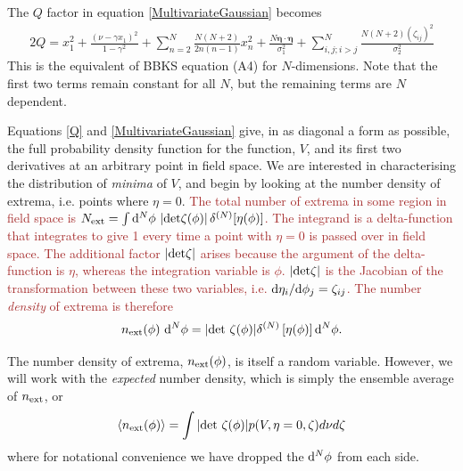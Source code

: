 \documentclass[12pt]{article}
\newcommand{\sh}[1]{\textcolor{brown}{#1}}
\begin{document}
The $Q$ factor in equation \eqref{MultivariateGaussian} becomes
%
\begin{equation} \label{Q}
\begin{split}
2Q = x_1^2 + \frac{(\nu-\gamma x_1)^2}{1-\gamma^2}+\sum_{n=2}^N\frac{N(N+2)}{2n(n-1)}x_n^2 + \frac{N \pmb{\eta}\cdot \pmb{\eta}}{\sigma_1^2} + \sum_{i,j;i > j}^N\frac{N(N+2)(\zeta_{ij})^2}{\sigma_2^2}
\end{split}
\end{equation}
%
This is the equivalent of BBKS equation (A4) for $N$-dimensions. Note that the first two terms remain constant for all $N$, but the remaining terms are $N$ dependent.  

Equations \eqref{Q} and \eqref{MultivariateGaussian} give, in as diagonal a form as possible, the full probability density function for the function, $V$, and its first two derivatives at an arbitrary point in field space. We are interested in characterising the distribution of \emph{minima} of $V$, and begin by looking at the number density of extrema, i.e. points where $\eta=0$. \sh{The total number of extrema in some region in field space is $N_{\rm ext} = \int {\rm d}^N\phi \, \left| {\rm det}\zeta(\phi)\right|\delta^{(N)}[\eta(\phi)]$. The integrand is a delta-function that integrates to give 1 every time a point with $\eta=0$ is passed over in field space. The additional factor $\left| {\rm det \zeta} \right|$ arises because the argument of the delta-function is $\eta$, whereas the integration variable is $\phi$. $|{\rm det}\zeta|$ is the Jacobian of the transformation between these two variables, i.e. ${\rm d}\eta_i/{\rm d}\phi_j = \zeta_{ij}$. The number \emph{density} of extrema is therefore}
%
\begin{equation}
n_{\rm ext}(\phi) \,\,{\rm d}^N \phi= |{\rm det}\,\, \zeta(\phi)| \delta^{(N)}\left[ \eta(\phi)\right] {\rm d}^N \phi.
\end{equation}

%
The number density of extrema, $n_{\rm ext}(\phi)$, is itself a random variable. However, we will work with the \emph{expected} number density, which is simply the ensemble average of $n_{\rm ext}$, or
% 
\begin{equation} \label{NumberDensity}
\langle n_{\rm ext}(\phi)  \rangle= \int |{\rm det}\,\, \zeta(\phi)| p(V,\eta=0,\zeta)d\nu d\zeta
\end{equation}
where for notational convenience we have dropped the ${\rm d}^N \phi$ from each side.
\end{document}
